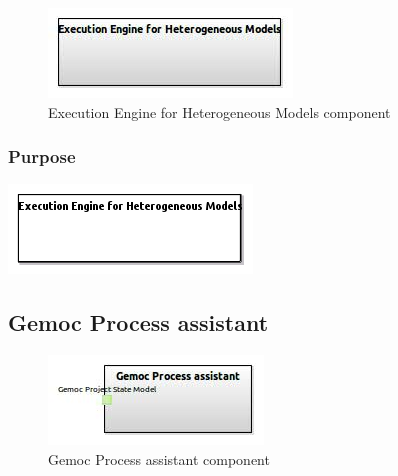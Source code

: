 \documentclass{gemoc} %
\begin{document}
\begin{figure}[htp]
	\begin{center}
	\includegraphics*[trim=0.0cm 0.0cm 0cm 0.0cm, clip=true, scale=1.0]{../images/generated/Generated_Execution Engine for Heterogeneous Models.jpg}
	\caption{Execution Engine for Heterogeneous Models component}
	\end{center}
\end{figure}

\subsubsection{Purpose}

\begin{center}
\includegraphics*[trim=0.0cm 0.0cm 0cm 0.0cm, clip=true]{../images/generated/Generated_Execution_Engine_for_Heterogeneous_Models.png}
\end{center}



\subsection{Gemoc Process assistant}

\begin{figure}[htp]
	\begin{center}
	\includegraphics*[trim=0.0cm 0.0cm 0cm 0.0cm, clip=true, scale=1.0]{../images/generated/Generated_Gemoc Process assistant.jpg}
	\caption{Gemoc Process assistant component}
	\end{center}
\end{figure}
\end{document}
